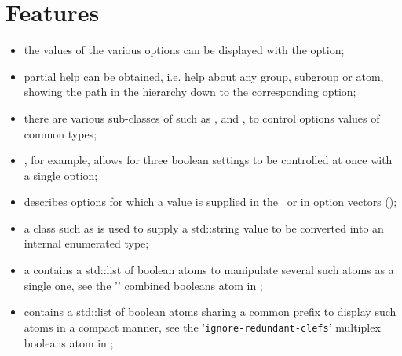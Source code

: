 %


\section{Features}

\begin{itemize}
\item the values of the various options can be displayed with the  option;

\item partial help can be obtained, i.e. help about any group, subgroup or atom,
    showing the path in the hierarchy down to the corresponding option;

\item there are various sub-classes of  such as , 
    and , to control options values of common types;

\item {}, for example, allows for three boolean settings
    to be controlled at once with a single option;

\item {} describes options for which a value is supplied
    in the \CLI\ or in option vectors (\API);

\item a class   such as  is used
    to supply a std::string value to be converted into an internal enumerated type;

\item a  contains a std::list of boolean atoms
    to manipulate several such atoms as a single one,
    see the '' combined booleans atom in ;

\item {} contains a std::list of boolean atoms
    sharing a common prefix to display such atoms in a compact manner,
    see the '{\tt ignore-redundant-clefs}' multiplex booleans atom in ;


\end{itemize}
